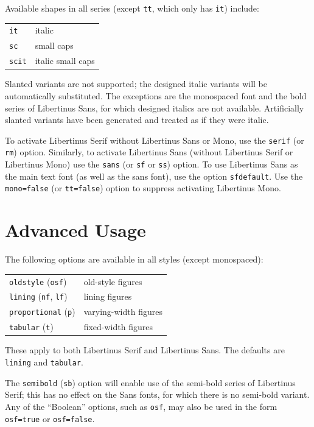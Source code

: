 \documentclass[11pt]{article}
\begin{document}
Available shapes in all series (except \texttt{tt}, which
only has \texttt{it}) include:
\begin{list}{}{}\item
\begin{tabular}{ll}
\texttt{it} &               italic\\
\texttt{sc} &            small caps\\
\texttt{scit} &            italic small caps
\end{tabular}
\end{list}
Slanted variants are not supported; the designed italic variants will be
automatically substituted. The exceptions are the monospaced font and the bold series of Libertinus Sans,
for which designed italics are not available. Artificially
slanted variants have been generated and treated as if they were italic.

To activate Libertinus Serif  without Libertinus Sans or Mono, use the \texttt{serif} (or \texttt{rm})
option. Similarly, to activate Libertinus Sans (without Libertinus Serif or Libertinus Mono) use the
\texttt{sans} (or \texttt{sf} or \texttt{ss}) option. To use Libertinus Sans as the main text font (as
well as the sans font), use the option \texttt{sfdefault}.
Use the \verb|mono=false| (or \verb|tt=false|) option to suppress
activating Libertinus Mono. 

\section{Advanced Usage}

The following options are available in all styles (except monospaced):
\begin{list}{}{}\item
\begin{tabular}{ll}
\texttt{oldstyle} (\texttt{osf}) &  old-style figures\\
\texttt{lining} (\texttt{nf}, \texttt{lf}) &  lining figures\\
\texttt{proportional} (\texttt{p})&  varying-width figures\\
\texttt{tabular} (\texttt{t}) &     fixed-width figures\\
\end{tabular}
\end{list}
These apply to both Libertinus Serif and Libertinus Sans.
The defaults are \texttt{lining} and \texttt{tabular}. 

The \texttt{semibold} (\texttt{sb}) option will enable use of the
semi-bold series of Libertinus Serif; this has no effect on the Sans fonts,
for which there is no semi-bold variant. 
Any of the ``Boolean'' options, such as \texttt{osf}, may 
also be used
in the form \verb|osf=true| or \verb|osf=false|.
\end{document}
